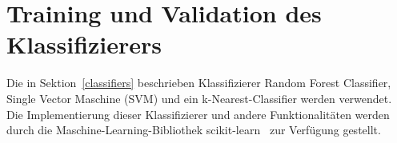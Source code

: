 \section{Training und Validation des Klassifizierers}

Die in Sektion~\ref{classifiers} beschrieben Klassifizierer Random Forest Classifier, Single Vector Maschine (SVM) und ein k-Nearest-Classifier werden verwendet.
Die Implementierung dieser Klassifizierer und andere Funktionalitäten werden durch die Maschine-Learning-Bibliothek scikit-learn~\cite{scikit-learn} zur Verfügung gestellt.
